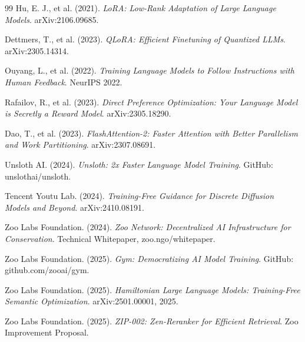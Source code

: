 \documentclass[twocolumn,11pt]{article}
\begin{document}
\begin{thebibliography}{99}
Hu, E. J., et al. (2021).
\textit{LoRA: Low-Rank Adaptation of Large Language Models}.
arXiv:2106.09685.

Dettmers, T., et al. (2023).
\textit{QLoRA: Efficient Finetuning of Quantized LLMs}.
arXiv:2305.14314.

Ouyang, L., et al. (2022).
\textit{Training Language Models to Follow Instructions with Human Feedback}.
NeurIPS 2022.

Rafailov, R., et al. (2023).
\textit{Direct Preference Optimization: Your Language Model is Secretly a Reward Model}.
arXiv:2305.18290.

Dao, T., et al. (2023).
\textit{FlashAttention-2: Faster Attention with Better Parallelism and Work Partitioning}.
arXiv:2307.08691.

Unsloth AI. (2024).
\textit{Unsloth: 2x Faster Language Model Training}.
GitHub: unslothai/unsloth.

Tencent Youtu Lab. (2024).
\textit{Training-Free Guidance for Discrete Diffusion Models and Beyond}.
arXiv:2410.08191.

Zoo Labs Foundation. (2024).
\textit{Zoo Network: Decentralized AI Infrastructure for Conservation}.
Technical Whitepaper, zoo.ngo/whitepaper.

Zoo Labs Foundation. (2025).
\textit{Gym: Democratizing AI Model Training}.
GitHub: github.com/zooai/gym.

Zoo Labs Foundation. (2025).
\textit{Hamiltonian Large Language Models: Training-Free Semantic Optimization}.
arXiv:2501.00001, 2025.

Zoo Labs Foundation. (2025).
\textit{ZIP-002: Zen-Reranker for Efficient Retrieval}.
Zoo Improvement Proposal.

\end{thebibliography}
\end{document}
